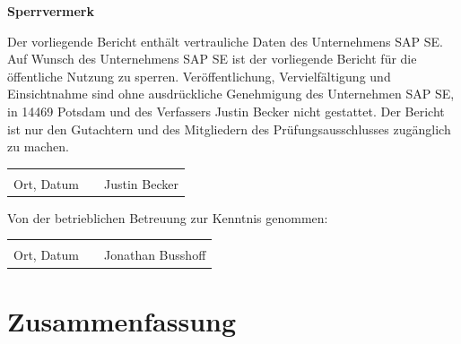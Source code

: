 \documentclass[
	12pt, %
	a4paper,
	bibliography=totoc, %
	numbers=noenddot, %
	ngerman, %
	headsepline, %
	oneside %
	]{scrbook} %
\newcommand{\studentName}{Justin Becker}
\newcommand{\betreuerUnt}{Jonathan Busshoff}
\begin{document}
\maketitle

\onehalfspacing

\textbf{Sperrvermerk}

Der vorliegende Bericht enthält vertrauliche Daten des Unternehmens SAP SE.
Auf Wunsch des Unternehmens SAP SE ist der vorliegende Bericht für die öffentliche Nutzung zu sperren.
Veröffentlichung, Vervielfältigung und Einsichtnahme sind ohne ausdrückliche Genehmigung des Unternehmen SAP SE, in 14469 Potsdam und des Verfassers Justin Becker nicht gestattet.
Der Bericht ist nur den Gutachtern und des Mitgliedern des Prüfungsausschlusses zugänglich zu machen.

\vspace{20mm}

\begin{tabular}{lp{2em}l} 
    \hspace{4cm}   && \hspace{4cm} \\\cline{1-1}\cline{3-3} 
    Ort, Datum     && \studentName{}
\end{tabular}

\vspace{\fill}
\normalsize{Von der betrieblichen Betreuung zur Kenntnis genommen:}
\vspace*{20mm}

\begin{tabular}{lp{2em}l} 
    \hspace{4cm}   && \hspace{4cm} \\\cline{1-1}\cline{3-3} 
    Ort, Datum     && \betreuerUnt
\end{tabular}



\chapter*{Zusammenfassung}

\end{document}
